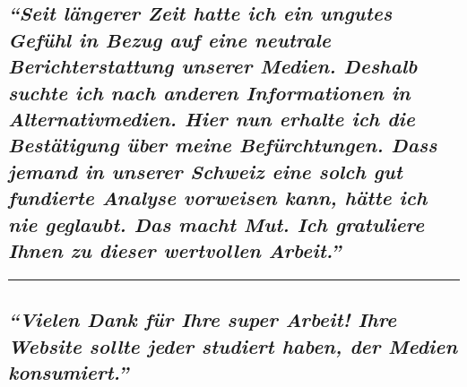 \hypertarget{seit-luxe4ngerer-zeit-hatte-ich-ein-ungutes-gefuxfchl-in-bezug-auf-eine-neutrale-berichterstattung-unserer-medien-deshalb-suchte-ich-nach-anderen-informationen-in-alternativmedien-hier-nun-erhalte-ich-die-bestuxe4tigung-uxfcber-meine-befuxfcrchtungen-dass-jemand-in-unserer-schweiz-eine-solch-gut-fundierte-analyse-vorweisen-kann-huxe4tte-ich-nie-geglaubt-das-macht-mut-ich-gratuliere-ihnen-zu-dieser-wertvollen-arbeit}{%
\subsection{\texorpdfstring{\emph{``Seit längerer Zeit hatte ich ein
ungutes Gefühl in Bezug auf eine neutrale Berichterstattung unserer
Medien. Deshalb suchte ich nach anderen Informationen in
Alternativmedien. Hier nun erhalte ich die Bestätigung über meine
Befürchtungen. Dass jemand in unserer Schweiz eine solch gut fundierte
Analyse vorweisen kann, hätte ich nie geglaubt. Das macht Mut. Ich
gratuliere Ihnen zu dieser wertvollen
Arbeit.''}}{``Seit längerer Zeit hatte ich ein ungutes Gefühl in Bezug auf eine neutrale Berichterstattung unserer Medien. Deshalb suchte ich nach anderen Informationen in Alternativmedien. Hier nun erhalte ich die Bestätigung über meine Befürchtungen. Dass jemand in unserer Schweiz eine solch gut fundierte Analyse vorweisen kann, hätte ich nie geglaubt. Das macht Mut. Ich gratuliere Ihnen zu dieser wertvollen Arbeit.''}}\label{seit-luxe4ngerer-zeit-hatte-ich-ein-ungutes-gefuxfchl-in-bezug-auf-eine-neutrale-berichterstattung-unserer-medien-deshalb-suchte-ich-nach-anderen-informationen-in-alternativmedien-hier-nun-erhalte-ich-die-bestuxe4tigung-uxfcber-meine-befuxfcrchtungen-dass-jemand-in-unserer-schweiz-eine-solch-gut-fundierte-analyse-vorweisen-kann-huxe4tte-ich-nie-geglaubt-das-macht-mut-ich-gratuliere-ihnen-zu-dieser-wertvollen-arbeit}}

\begin{center}\rule{0.5\linewidth}{\linethickness}\end{center}

\hypertarget{vielen-dank-fuxfcr-ihre-super-arbeit-ihre-website-sollte-jeder-studiert-haben-der-medien-konsumiert}{%
\subsection{\texorpdfstring{\emph{``Vielen Dank für Ihre super Arbeit!
Ihre Website sollte jeder studiert haben, der Medien
konsumiert.''}}{``Vielen Dank für Ihre super Arbeit! Ihre Website sollte jeder studiert haben, der Medien konsumiert.''}}\label{vielen-dank-fuxfcr-ihre-super-arbeit-ihre-website-sollte-jeder-studiert-haben-der-medien-konsumiert}}

